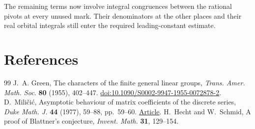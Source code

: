 \documentclass[a4paper,11pt]{article}
\theoremstyle{definition}
\theoremstyle{remark}
\numberwithin{equation}{section}
\begin{document}
The remaining terms now involve integral congruences between
the rational pivots at every unused mark. Their denominators
at the other places and their real orbital integrals still
enter the required leading-constant estimate.
\clearpage

\section{References}\label{nav:bibliography-XXV}
\begingroup{}\begin{thebibliography}{99}\small
{} J.~A. Green, The characters of the finite general linear groups, \emph{Trans. Amer. Math. Soc.} \textbf{80} (1955), 402--447. \href{https://doi.org/10.1090/S0002-9947-1955-0072878-2}{doi:10.1090/S0002-9947-1955-0072878-2}.
 D.~Mili\v ci\'c, Asymptotic behaviour of matrix coefficients of the discrete series, \emph{Duke Math. J.} \textbf{44} (1977), 59--88, pp.~59--60. \href{https://www.math.utah.edu/~ptrapa/math-library/milicic/milicic-asymptotics-duke-1977.pdf}{Article}.
 H.~Hecht and W.~Schmid, A proof of Blattner's conjecture, \emph{Invent. Math.} \textbf{31}, 129--154.
\end{thebibliography}\endgroup
\end{document}
